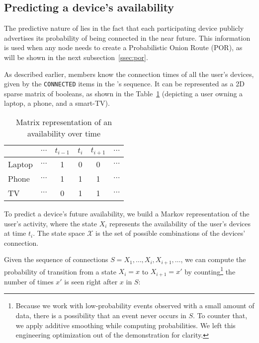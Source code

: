 \subsection{Predicting a device's availability}
\label{ssec:device_availability}

The predictive nature of \name lies in the fact that each participating device publicly advertises its probability of being connected in the near future. 
This information is used when any node needs to create a Probabilistic Onion Route (POR), as will be shown in the next subsection~\ref{ssec:por}.

As described earlier, \squad members know the connection times of all the user's devices, given by the \texttt{CONNECTED} items in the \squad's sequence.
It can be represented as a 2D sparse matrix of booleans, as shown in the Table~\ref{tab:connection_times} (depicting a user owning a laptop, a phone, and a smart-TV).


\begin{table}
\caption{Matrix representation of an \squad availability over time}
\centering
\begin{tabular}{@{}lccccc@{}} \toprule
		& $\cdots$	& $t_{i-1}$	& $t_i$		& $t_{i+1}$	& $\cdots$ \\ \midrule
Laptop	& $\cdots$	& 1			& 0			& 0			& $\cdots$ \\
Phone	& $\cdots$	& 1			& 1			& 1			& $\cdots$ \\
TV		& $\cdots$	& 0			& 1			& 1			& $\cdots$ \\ \bottomrule
\end{tabular}
\label{tab:connection_times}
\end{table}

To predict a device's future availability, we build a Markov representation of the user's activity, 
where the state $X_i$ represents the availability of the user's devices at time $t_i$.
The state space $\mathcal{X}$ is the set of possible combinations of the devices' connection.

Given the \squad sequence of connections $S = X_1, \dots, X_i, X_{i+1}, \dots$,
we can compute the probability of transition from a state $X_i=x$ to $X_{i+1}=x'$ by counting\footnote{%
	Because we work with low-probability events observed with a small amount of data, there is a possibility that an event never occurs in $S$. 
	To counter that, we apply additive smoothing while computing probabilities. 
	We left this engineering optimization out of the demonstration for clarity.
} the number of times $x'$ is seen right after $x$ in $S$:

